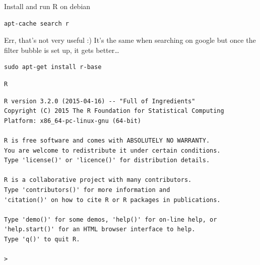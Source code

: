 \documentclass[xcolor=x11names,compress,8pt]{beamer}
\renewcommand{\(}{\begin{columns}}
\renewcommand{\)}{\end{columns}}
\newcommand{\<}[1]{\begin{column}{#1}}
\renewcommand{\>}{\end{column}}
\begin{document}
\begin{frame}[fragile,label=sec-4-1-4]{Install and run R on debian}
 \small
\begin{verbatim}
apt-cache search r
\end{verbatim}
Err, that's not very useful :) It's the same when searching on
google but once the filter bubble is set up, it gets better\ldots{}
\begin{verbatim}
sudo apt-get install r-base
\end{verbatim}

\begin{verbatim}
R
\end{verbatim}

\scriptsize
\begin{verbatim}
R version 3.2.0 (2015-04-16) -- "Full of Ingredients"
Copyright (C) 2015 The R Foundation for Statistical Computing
Platform: x86_64-pc-linux-gnu (64-bit)

R is free software and comes with ABSOLUTELY NO WARRANTY.
You are welcome to redistribute it under certain conditions.
Type 'license()' or 'licence()' for distribution details.

R is a collaborative project with many contributors.
Type 'contributors()' for more information and
'citation()' on how to cite R or R packages in publications.

Type 'demo()' for some demos, 'help()' for on-line help, or
'help.start()' for an HTML browser interface to help.
Type 'q()' to quit R.

>
\end{verbatim}
\end{frame}
\end{document}
